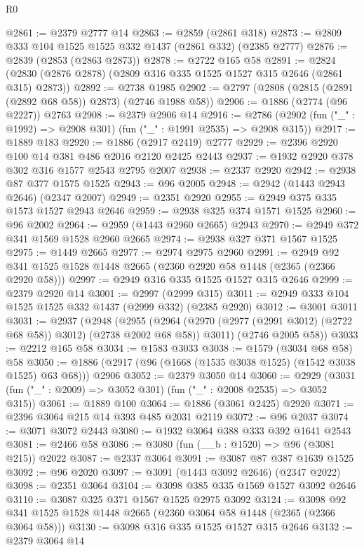 \begin{lexlean}{R0}
\begin{coremodule}
@2861 := @2379 @2777 @14
@2863 := @2859 (@2861 @318)
@2873 := @2809 @333 @104 @1525 @1525 @332 @1437 (@2861 @332) (@2385 @2777)
@2876 := @2839 (@2853 (@2863 @2873))
@2878 := @2722 @165 @58
@2891 := @2824 (@2830 (@2876 @2878) (@2809 @316 @335 @1525 @1527 @315 @2646 (@2861 @315) @2873))
@2892 := @2738 @1985
@2902 := @2797 (@2808 (@2815 (@2891 (@2892 @68 @58)) @2873) (@2746 @1988 @58))
@2906 := @1886 (@2774 (@96 @2227)) @2763
@2908 := @2379 @2906 @14
@2916 := @2786 (@2902 (fun ("_" : @1992) => @2908 @301) (fun ("_" : @1991 @2535) => @2908 @315))
@2917 := @1889 @183
@2920 := @1886 (@2917 @2419) @2777
@2929 := @2396 @2920 @100 @14 @381 @486 @2016 @2120 @2425 @2443
@2937 := @1932 @2920 @378 @302 @316 @1577 @2543 @2795 @2007
@2938 := @2337 @2920
@2942 := @2938 @87 @377 @1575 @1525
@2943 := @96 @2005
@2948 := @2942 (@1443 @2943 @2646) (@2347 @2007)
@2949 := @2351 @2920
@2955 := @2949 @375 @335 @1573 @1527 @2943 @2646
@2959 := @2938 @325 @374 @1571 @1525
@2960 := @96 @2002
@2964 := @2959 (@1443 @2960 @2665) @2943
@2970 := @2949 @372 @341 @1569 @1528 @2960 @2665
@2974 := @2938 @327 @371 @1567 @1525
@2975 := @1449 @2665
@2977 := @2974 @2975 @2960
@2991 := @2949 @92 @341 @1525 @1528 @1448 @2665 (@2360 @2920 @58 @1448 (@2365 (@2366 @2920 @58)))
@2997 := @2949 @316 @335 @1525 @1527 @315 @2646
@2999 := @2379 @2920 @14
@3001 := @2997 (@2999 @315)
@3011 := @2949 @333 @104 @1525 @1525 @332 @1437 (@2999 @332) (@2385 @2920)
@3012 := @3001 @3011
@3031 := @2937
    (@2948
      (@2955
        (@2964 (@2970 (@2977 (@2991 @3012) (@2722 @68 @58)) @3012) (@2738 @2002 @68 @58))
        @3011)
      (@2746 @2005 @58))
@3033 := @2212 @165 @58
@3034 := @1583 @3033
@3038 := @1579 (@3034 @68 @58) @58
@3050 := @1886 (@2917 (@96 (@1668 (@1535 @3038 @1525) (@1542 @3038 @1525) @63 @68))) @2906
@3052 := @2379 @3050 @14
@3060 := @2929 (@3031 (fun ("_" : @2009) => @3052 @301) (fun ("_" : @2008 @2535) => @3052 @315))
@3061 := @1889 @100
@3064 := @1886 (@3061 @2425) @2920
@3071 := @2396 @3064 @215 @14 @393 @485 @2031 @2119
@3072 := @96 @2037
@3074 := @3071 @3072 @2443
@3080 := @1932 @3064 @388 @333 @392 @1641 @2543
@3081 := @2466 @58
@3086 := @3080 (fun (__b : @1520) => @96 (@3081 @215)) @2022
@3087 := @2337 @3064
@3091 := @3087 @87 @387 @1639 @1525
@3092 := @96 @2020
@3097 := @3091 (@1443 @3092 @2646) (@2347 @2022)
@3098 := @2351 @3064
@3104 := @3098 @385 @335 @1569 @1527 @3092 @2646
@3110 := @3087 @325 @371 @1567 @1525 @2975 @3092
@3124 := @3098 @92 @341 @1525 @1528 @1448 @2665 (@2360 @3064 @58 @1448 (@2365 (@2366 @3064 @58)))
@3130 := @3098 @316 @335 @1525 @1527 @315 @2646
@3132 := @2379 @3064 @14

\end{coremodule}
\end{lexlean}
